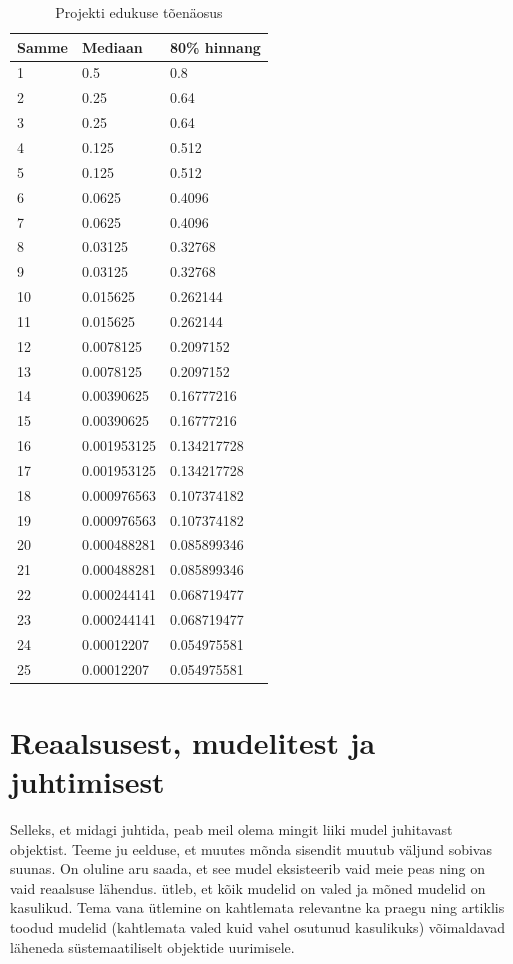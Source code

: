 \documentclass{tufte-book}
\begin{document}
\begin{table}
	\begin{center}
\begin{tabular}{lll}

\toprule
Samme & Mediaan & 80\% hinnang \\
\midrule
1 & 0.5 & 0.8 \\
2 & 0.25 & 0.64 \\
3 & 0.25 & 0.64 \\
4 & 0.125 & 0.512 \\
5 & 0.125 & 0.512 \\
6 & 0.0625 & 0.4096 \\
7 & 0.0625 & 0.4096 \\
8 & 0.03125 & 0.32768 \\
9 & 0.03125 & 0.32768 \\
10 & 0.015625 & 0.262144 \\
11 & 0.015625 & 0.262144 \\
12 & 0.0078125 & 0.2097152 \\
13 & 0.0078125 & 0.2097152 \\
14 & 0.00390625 & 0.16777216 \\
15 & 0.00390625 & 0.16777216 \\
16 & 0.001953125 & 0.134217728 \\
17 & 0.001953125 & 0.134217728 \\
18 & 0.000976563 & 0.107374182 \\
19 & 0.000976563 & 0.107374182 \\
20 & 0.000488281 & 0.085899346 \\
21 & 0.000488281 & 0.085899346 \\
22 & 0.000244141 & 0.068719477 \\
23 & 0.000244141 & 0.068719477 \\
24 & 0.00012207 & 0.054975581 \\
25 & 0.00012207 & 0.054975581 \\

\bottomrule
\end{tabular}
		\caption{Projekti edukuse tõenäosus}
		\label{tab:success}

	\end{center}
\end{table}

\section{Reaalsusest, mudelitest ja juhtimisest}
Selleks, et midagi juhtida, peab meil olema mingit liiki mudel juhitavast objektist. Teeme ju eelduse, et muutes mõnda sisendit muutub väljund sobivas suunas. On oluline aru saada, et see mudel eksisteerib vaid meie peas ning on vaid reaalsuse lähendus. \citeauthor{box1976science} ütleb, et kõik mudelid on valed ja mõned mudelid on kasulikud\cite{box1976science}. Tema vana ütlemine on kahtlemata relevantne ka praegu ning artiklis toodud mudelid (kahtlemata valed kuid vahel osutunud kasulikuks) võimaldavad läheneda süstemaatiliselt objektide uurimisele. 
\end{document}
